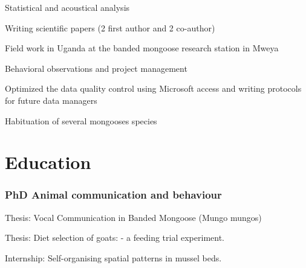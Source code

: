 \documentclass[letterpaper]{deedy-resume} %
\begin{document}
\begin{minipage}[t]{0.66\textwidth}
\sectionspace %

\begin{tightitemize}
\item Statistical and acoustical analysis
\item Writing scientific papers (2 first author and 2 co-author)
\item Field work in Uganda at the banded mongoose research station in Mweya
\end{tightitemize}
\sectionspace %

\begin{tightitemize}
\item Behavioral observations and project management 
\item Optimized the data quality control using Microsoft access and writing protocols for future data managers
\item Habituation of several mongooses species
\end{tightitemize}

\sectionspace %

\section{Education}

\subsubsection*{PhD Animal communication and behaviour}
\vspace{\topsep} %
\begin{tightitemize}
\item Thesis: Vocal Communication in Banded Mongoose (Mungo mungos)
\end{tightitemize}

\sectionspace %

\vspace{\topsep} %
\begin{tightitemize}
\item Thesis: Diet selection of goats: - a feeding trial experiment.
\item Internship: Self-organising spatial patterns in mussel beds.
\end{tightitemize}
\sectionspace %


\end{minipage}
\end{document}
